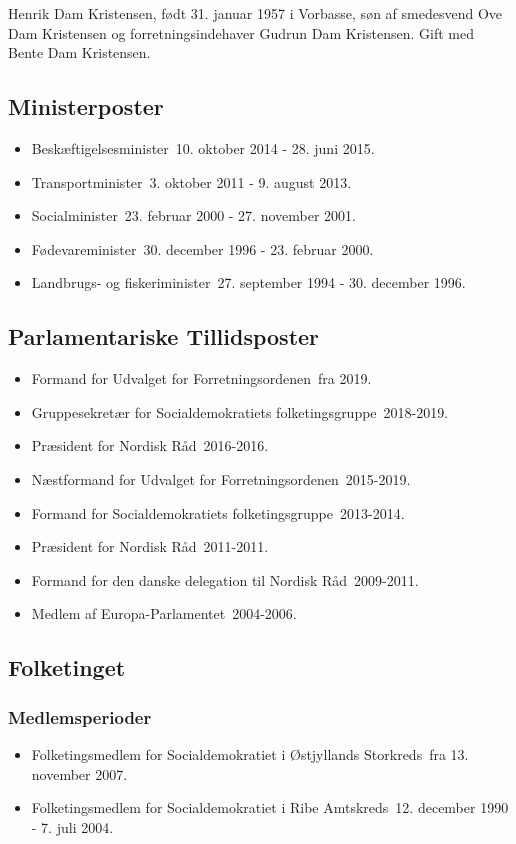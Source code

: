\documentclass[11pt, a4paper]{awesome-cv}
\begin{document}
\makecvheader[R]
\makelettertitle
\begin{cvletter}
Henrik Dam Kristensen, født 31. januar 1957 i Vorbasse, søn af smedesvend Ove Dam Kristensen og forretningsindehaver Gudrun Dam Kristensen. Gift med Bente Dam Kristensen.

\subsection*{Ministerposter}
\begin{itemize}
\item Beskæftigelsesminister 10. oktober 2014 - 28. juni 2015.
\item Transportminister 3. oktober 2011 - 9. august 2013.
\item Socialminister 23. februar 2000 - 27. november 2001.
\item Fødevareminister 30. december 1996 - 23. februar 2000.
\item Landbrugs- og fiskeriminister 27. september 1994 - 30. december 1996.
\end{itemize}
\subsection*{Parlamentariske Tillidsposter}
\begin{itemize}
\item Formand for Udvalget for Forretningsordenen fra 2019.
\item Gruppesekretær for Socialdemokratiets folketingsgruppe 2018-2019.
\item Præsident for Nordisk Råd 2016-2016.
\item Næstformand for Udvalget for Forretningsordenen 2015-2019.
\item Formand for Socialdemokratiets folketingsgruppe 2013-2014.
\item Præsident for Nordisk Råd 2011-2011.
\item Formand for den danske delegation til Nordisk Råd 2009-2011.
\item Medlem af Europa-Parlamentet 2004-2006.
\end{itemize}
\subsection*{Folketinget}
\subsubsection*{Medlemsperioder}
\begin{itemize}
\item Folketingsmedlem for Socialdemokratiet i Østjyllands Storkreds fra 13. november 2007.
\item Folketingsmedlem for Socialdemokratiet i Ribe Amtskreds 12. december 1990 - 7. juli 2004.
\end{itemize}

\end{cvletter}
\end{document}
